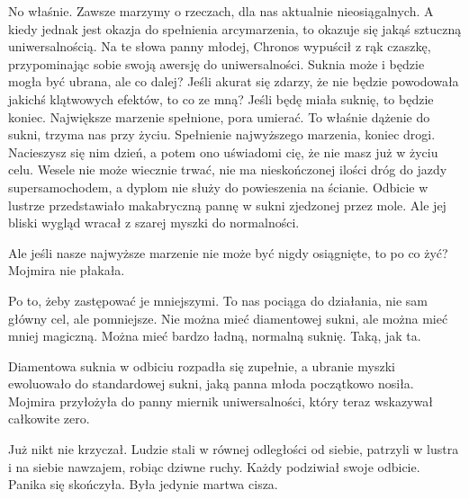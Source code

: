 \ds{} No właśnie. Zawsze marzymy o rzeczach, dla nas aktualnie nieosiągalnych.
A kiedy jednak jest okazja do spełnienia arcymarzenia, to okazuje się jakąś sztuczną uniwersalnością. \dm{} Na te słowa panny młodej, Chronos wypuścił z rąk czaszkę,
przypominając sobie swoją awersję do uniwersalności. \dm{} Suknia może i będzie mogła być ubrana, ale co dalej? Jeśli akurat się zdarzy, że nie będzie powodowała
jakichś klątwowych efektów, to co ze mną? Jeśli będę miała suknię, to będzie koniec. Największe marzenie spełnione, pora umierać.
To właśnie dążenie do sukni, trzyma nas przy życiu. Spełnienie najwyższego marzenia, koniec drogi. Nacieszysz się nim dzień, a potem ono uświadomi cię, że nie masz już w życiu celu.
Wesele nie może wiecznie trwać, nie ma nieskończonej ilości dróg do jazdy supersamochodem, a dyplom nie służy do powieszenia na ścianie. \dm{} Odbicie w lustrze przedstawiało makabryczną pannę w 
sukni zjedzonej przez mole. Ale jej bliski wygląd wracał z szarej myszki do normalności. \de{}

\ds{} Ale jeśli nasze najwyższe marzenie nie może być nigdy osiągnięte, to po co żyć? \dm{} Mojmira nie płakała. \de{}

\ds{} Po to, żeby zastępować je mniejszymi. To nas pociąga do działania, nie sam główny cel, ale pomniejsze. 
Nie można mieć diamentowej sukni, ale można mieć mniej magiczną. Można mieć bardzo ładną, normalną suknię.
Taką, jak ta. \de{} 

Diamentowa suknia w odbiciu rozpadła się zupełnie, a ubranie myszki ewoluowało do standardowej sukni, jaką panna młoda początkowo nosiła.
Mojmira przyłożyła do panny miernik uniwersalności, który teraz wskazywał całkowite zero.

\divider{}

Już nikt nie krzyczał. 
Ludzie stali w równej odległości od siebie, patrzyli w lustra i na siebie nawzajem, robiąc dziwne ruchy.
Każdy podziwiał swoje odbicie. Panika się skończyła. Była jedynie martwa cisza.

